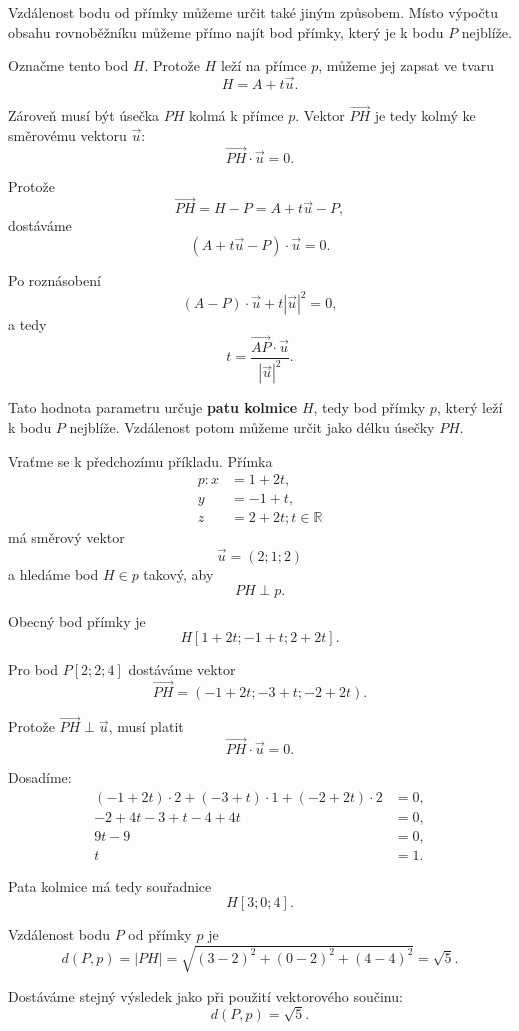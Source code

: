 Vzdálenost bodu od přímky můžeme určit také jiným způsobem.
Místo výpočtu obsahu rovnoběžníku můžeme přímo najít bod přímky,
který je k bodu $P$ nejblíže.

Označme tento bod $H$. Protože $H$ leží na přímce $p$, můžeme jej
zapsat ve tvaru
\[
    H=A+t\vec{u}.
\]

Zároveň musí být úsečka $PH$ kolmá k přímce $p$. Vektor
$\overrightarrow{PH}$ je tedy kolmý ke směrovému vektoru $\vec{u}$:
\[
    \overrightarrow{PH}\cdot\vec{u}=0.
\]

Protože
\[
    \overrightarrow{PH}
    =
    H-P
    =
    A+t\vec{u}-P,
\]
dostáváme
\[
    (A+t\vec{u}-P)\cdot\vec{u}=0.
\]

Po roznásobení
\[
    (A-P)\cdot\vec{u}
    +
    t|\vec{u}|^2
    =
    0,
\]
a tedy
\[
    t
    =
    \frac{
        \overrightarrow{AP}\cdot\vec{u}
    }{
        |\vec{u}|^2
    }.
\]

Tato hodnota parametru určuje \textbf{patu kolmice} $H$, tedy bod
přímky $p$, který leží k bodu $P$ nejblíže. Vzdálenost potom můžeme
určit jako délku úsečky $PH$.

\begin{example}
    \label{exa:Foot_perpendicular_point_line_space}

    Vraťme se k předchozímu příkladu. Přímka
    \[
        \begin{aligned}
            p: x&=1+2t,\\
            y&=-1+t,\\
            z&=2+2t; t\in\mathbb{R}
        \end{aligned}
    \]
    má směrový vektor
    \[
        \vec{u}=(2;1;2)
    \]
    a hledáme bod $H\in p$ takový, aby
    \[
        PH\perp p.
    \]

    Obecný bod přímky je
    \[
        H[1+2t;-1+t;2+2t].
    \]

    Pro bod $P[2;2;4]$ dostáváme vektor
    \[
        \overrightarrow{PH}
        =
        (-1+2t;-3+t;-2+2t).
    \]

    Protože $\overrightarrow{PH}\perp\vec{u}$, musí platit
    \[
        \overrightarrow{PH}\cdot\vec{u}=0.
    \]

    Dosadíme:
    \begin{align*}
        (-1+2t)\cdot2
        +(-3+t)\cdot1
        +(-2+2t)\cdot2
        &=0,\\
        -2+4t-3+t-4+4t
        &=0,\\
        9t-9&=0,\\
        t&=1.
    \end{align*}

    Pata kolmice má tedy souřadnice
    \[
        H[3;0;4].
    \]

    Vzdálenost bodu $P$ od přímky $p$ je
    \[
        d(P,p)
        =
        |PH|
        =
        \sqrt{(3-2)^2+(0-2)^2+(4-4)^2}
        =
        \sqrt5.
    \]

    Dostáváme stejný výsledek jako při použití vektorového součinu:
    \[
        d(P,p)=\sqrt5.
    \]
\end{example}

